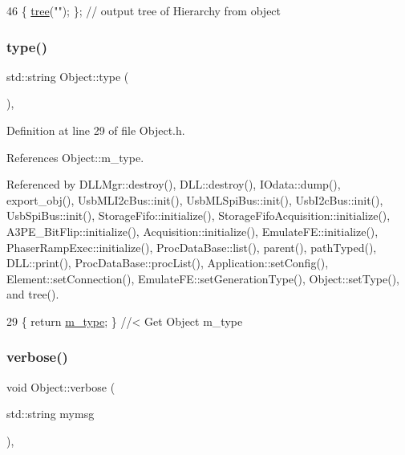 \begin{DoxyCode}
46 \{ \hyperlink{classHierarchy_a594c294c5f60c230e106d522ed008212}{tree}(\textcolor{stringliteral}{""}); \};                     \textcolor{comment}{// output tree of Hierarchy from object}
\end{DoxyCode}
\mbox{\label{classObject_a84f99f70f144a83e1582d1d0f84e4e62}} 
\subsubsection{\texorpdfstring{type()}{type()}}
{\footnotesize\ttfamily std\+::string Object\+::type (\begin{DoxyParamCaption}{ }\end{DoxyParamCaption})\hspace{0.3cm}{\ttfamily [inline]}, {\ttfamily [inherited]}}



Definition at line 29 of file Object.\+h.



References Object\+::m\+\_\+type.



Referenced by D\+L\+L\+Mgr\+::destroy(), D\+L\+L\+::destroy(), I\+Odata\+::dump(), export\+\_\+obj(), Usb\+M\+L\+I2c\+Bus\+::init(), Usb\+M\+L\+Spi\+Bus\+::init(), Usb\+I2c\+Bus\+::init(), Usb\+Spi\+Bus\+::init(), Storage\+Fifo\+::initialize(), Storage\+Fifo\+Acquisition\+::initialize(), A3\+P\+E\+\_\+\+Bit\+Flip\+::initialize(), Acquisition\+::initialize(), Emulate\+F\+E\+::initialize(), Phaser\+Ramp\+Exec\+::initialize(), Proc\+Data\+Base\+::list(), parent(), path\+Typed(), D\+L\+L\+::print(), Proc\+Data\+Base\+::proc\+List(), Application\+::set\+Config(), Element\+::set\+Connection(), Emulate\+F\+E\+::set\+Generation\+Type(), Object\+::set\+Type(), and tree().


\begin{DoxyCode}
29 \{ \textcolor{keywordflow}{return} \hyperlink{classObject_a457a600fe8c00eb1034374f75110a78c}{m\_type};       \} \textcolor{comment}{//< Get Object m\_type}
\end{DoxyCode}
\mbox{\label{classObject_a83d2db2df682907ea1115ad721c1c4a1}} 
\subsubsection{\texorpdfstring{verbose()}{verbose()}\hspace{0.1cm}{\footnotesize\ttfamily [1/2]}}
{\footnotesize\ttfamily void Object\+::verbose (\begin{DoxyParamCaption}\item[{std\+::string}]{mymsg }\end{DoxyParamCaption})\hspace{0.3cm}{\ttfamily [inline]}, {\ttfamily [inherited]}}



